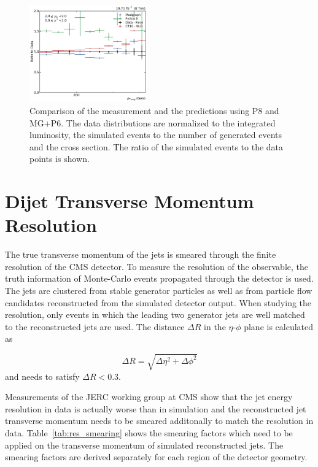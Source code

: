 \begin{figure}[htbp]
    \includegraphics[width=0.45\textwidth]{figures/measurement/ratio_reco_to_data_yb2ys0.pdf}
    \caption[Comparison of data with simulated events]{Comparison of the measurement and the predictions using P8 and MG+P6. The data distributions are normalized
    to the integrated luminosity, the simulated events to the number of generated events and the cross section. The ratio of the simulated
    events to the data points is shown.}
    \label{fig:ratio_recotodata}
\end{figure}


\section{Dijet Transverse Momentum  Resolution}
\label{sec:resolution}

The true transverse momentum of the jets is smeared through the finite
resolution of the CMS detector. To measure the resolution of the \ptavg
observable, the truth information of Monte-Carlo events propagated through the
detector is used. The jets are clustered from stable generator particles as well
as from particle flow candidates reconstructed from the simulated detector
output. When studying the resolution, only events in which the leading two
generator jets are well matched to the reconstructed jets are used. The distance
$\Delta R$ in the $\eta$-$\phi$ plane is calculated as

\begin{equation}
\Delta R = \sqrt{\Delta \eta^2 + \Delta \phi^2}
\end{equation}
and needs to satisfy $\Delta R < 0.3$.

Measurements of the JERC working group at CMS show that the jet energy
resolution in data is actually worse than in simulation and the reconstructed
jet transverse momentum needs to be smeared additonally to match the resolution
in data. Table~\ref{tab:res_smearing} shows the smearing factors which need to
be applied on the transverse momentum of simulated reconstructed jets. The
smearing factors are derived separately for each region of the detector geometry.

